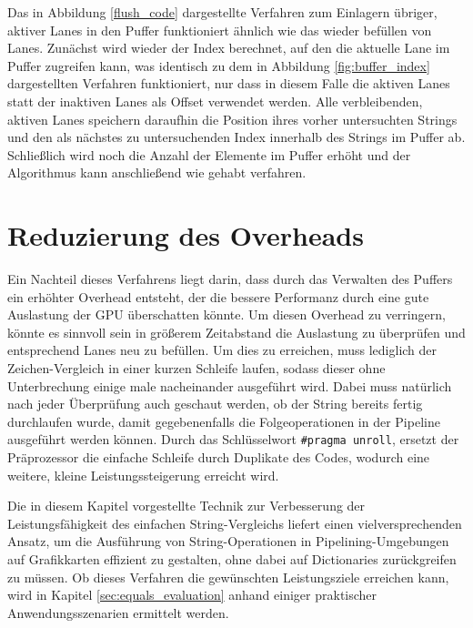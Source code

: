 Das in Abbildung \ref{flush_code} dargestellte Verfahren zum Einlagern übriger, aktiver Lanes in den Puffer funktioniert ähnlich wie das wieder befüllen von Lanes.
Zunächst wird wieder der Index berechnet, auf den die aktuelle Lane im Puffer zugreifen kann, was identisch zu dem in Abbildung \ref{fig:buffer_index} dargestellten Verfahren funktioniert, nur dass in diesem Falle die aktiven Lanes statt der inaktiven Lanes als Offset verwendet werden.
Alle verbleibenden, aktiven Lanes speichern daraufhin die Position ihres vorher untersuchten Strings und den als nächstes zu untersuchenden Index innerhalb des Strings im Puffer ab.
Schließlich wird noch die Anzahl der Elemente im Puffer erhöht und der Algorithmus kann anschließend wie gehabt verfahren.

\section{Reduzierung des Overheads}
\label{sec:unroll}

Ein Nachteil dieses Verfahrens liegt darin, dass durch das Verwalten des Puffers ein erhöhter Overhead entsteht, der die bessere Performanz durch eine gute Auslastung der GPU überschatten könnte.
Um diesen Overhead zu verringern, könnte es sinnvoll sein in größerem Zeitabstand die Auslastung zu überprüfen und entsprechend Lanes neu zu befüllen.
Um dies zu erreichen, muss lediglich der Zeichen-Vergleich in einer kurzen Schleife laufen, sodass dieser ohne Unterbrechung einige male nacheinander ausgeführt wird.
Dabei muss natürlich nach jeder Überprüfung auch geschaut werden, ob der String bereits fertig durchlaufen wurde, damit gegebenenfalls die Folgeoperationen in der Pipeline ausgeführt werden können.
Durch das Schlüsselwort \texttt{\#pragma unroll}, ersetzt der Präprozessor die einfache Schleife durch Duplikate des Codes, wodurch eine weitere, kleine Leistungssteigerung erreicht wird.

Die in diesem Kapitel vorgestellte Technik zur Verbesserung der Leistungsfähigkeit des einfachen String-Vergleichs liefert einen vielversprechenden Ansatz, um die Ausführung von String-Operationen in Pipelining-Umgebungen auf Grafikkarten effizient zu gestalten, ohne dabei auf Dictionaries zurückgreifen zu müssen.
Ob dieses Verfahren die gewünschten Leistungsziele erreichen kann, wird in Kapitel \ref{sec:equals_evaluation} anhand einiger praktischer Anwendungsszenarien ermittelt werden.